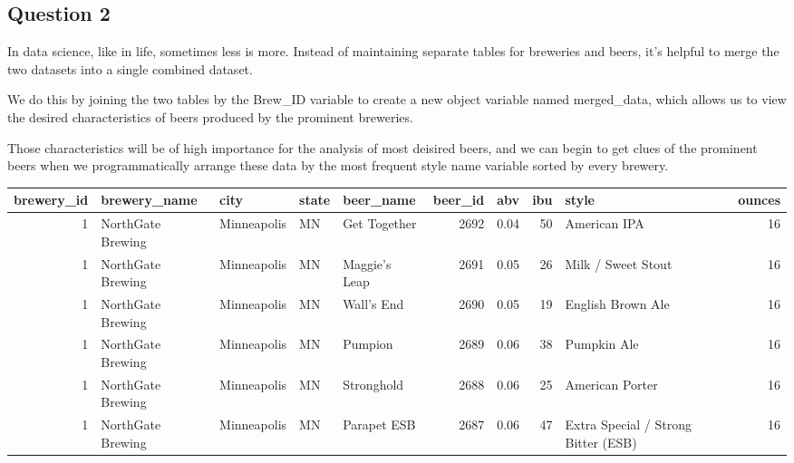 \documentclass[]{article}
\newenvironment{Shaded}{\begin{snugshade}}{\end{snugshade}}
\newcommand{\KeywordTok}[1]{\textcolor[rgb]{0.13,0.29,0.53}{\textbf{#1}}}
\newcommand{\DataTypeTok}[1]{\textcolor[rgb]{0.13,0.29,0.53}{#1}}
\newcommand{\DecValTok}[1]{\textcolor[rgb]{0.00,0.00,0.81}{#1}}
\newcommand{\StringTok}[1]{\textcolor[rgb]{0.31,0.60,0.02}{#1}}
\newcommand{\CommentTok}[1]{\textcolor[rgb]{0.56,0.35,0.01}{\textit{#1}}}
\newcommand{\OperatorTok}[1]{\textcolor[rgb]{0.81,0.36,0.00}{\textbf{#1}}}
\newcommand{\NormalTok}[1]{#1}
\begin{document}
\subsection{Question 2}\label{question-2}

In data science, like in life, sometimes less is more. Instead of
maintaining separate tables for breweries and beers, it's helpful to
merge the two datasets into a single combined dataset.

We do this by joining the two tables by the Brew\_ID variable to create
a new object variable named merged\_data, which allows us to view the
desired characteristics of beers produced by the prominent breweries.

Those characteristics will be of high importance for the analysis of
most deisired beers, and we can begin to get clues of the prominent
beers when we programmatically arrange these data by the most frequent
style name variable sorted by every brewery.

\begin{Shaded}
\end{Shaded}

\begin{longtable}[]{@{}rllllrrrlr@{}}
\toprule
brewery\_id & brewery\_name & city & state & beer\_name & beer\_id & abv
& ibu & style & ounces\tabularnewline
\midrule
\endhead
1 & NorthGate Brewing & Minneapolis & MN & Get Together & 2692 & 0.04 &
50 & American IPA & 16\tabularnewline
1 & NorthGate Brewing & Minneapolis & MN & Maggie's Leap & 2691 & 0.05 &
26 & Milk / Sweet Stout & 16\tabularnewline
1 & NorthGate Brewing & Minneapolis & MN & Wall's End & 2690 & 0.05 & 19
& English Brown Ale & 16\tabularnewline
1 & NorthGate Brewing & Minneapolis & MN & Pumpion & 2689 & 0.06 & 38 &
Pumpkin Ale & 16\tabularnewline
1 & NorthGate Brewing & Minneapolis & MN & Stronghold & 2688 & 0.06 & 25
& American Porter & 16\tabularnewline
1 & NorthGate Brewing & Minneapolis & MN & Parapet ESB & 2687 & 0.06 &
47 & Extra Special / Strong Bitter (ESB) & 16\tabularnewline
\bottomrule
\end{longtable}
\end{document}
